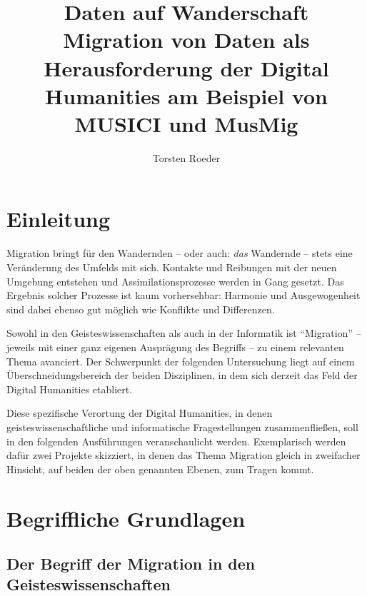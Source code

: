 \documentclass[a4paper,
fontsize=11pt,
oneside,
numbers=noperiodatend,
parskip=half-,
bibliography=totoc,
final
]{scrartcl}
\title{\LARGE{Daten auf Wanderschaft} \\ Migration von Daten als Herausforderung der Digital Humanities am Beispiel von MUSICI und MusMig} %
\author{Torsten Roeder} %
\date{}
\begin{document}
\maketitle
\thispagestyle{fancyplain} 


\section*{Einleitung}\label{einleitung}

Migration bringt für den Wandernden -- oder auch: \emph{das} Wandernde
-- stets eine Veränderung des Umfelds mit sich. Kontakte und Reibungen
mit der neuen Umgebung entstehen und Assimilationsprozesse werden in
Gang gesetzt. Das Ergebnis solcher Prozesse ist kaum vorhersehbar:
Harmonie und Ausgewogenheit sind dabei ebenso gut möglich wie Konflikte
und Differenzen.

Sowohl in den Geisteswissenschaften als auch in der Informatik ist
\enquote{Migration} -- jeweils mit einer ganz eigenen Ausprägung des
Begriffs -- zu einem relevanten Thema avanciert. Der Schwerpunkt der
folgenden Untersuchung liegt auf einem Überschneidungsbereich der beiden
Disziplinen, in dem sich derzeit das Feld der Digital Humanities
etabliert.

Diese spezifische Verortung der Digital Humanities, in denen
geisteswissenschaftliche und informatische Fragestellungen
zusammenfließen, soll in den folgenden Ausführungen veranschaulicht
werden. Exemplarisch werden dafür zwei Projekte skizziert, in denen das
Thema Migration gleich in zweifacher Hinsicht, auf beiden der oben
genannten Ebenen, zum Tragen kommt.

\section*{Begriffliche Grundlagen}\label{begriffliche-grundlagen}

\subsection*{Der Begriff der Migration in den
Geisteswissenschaften}\label{der-begriff-der-migration-in-den-geisteswissenschaften}
\end{document}
